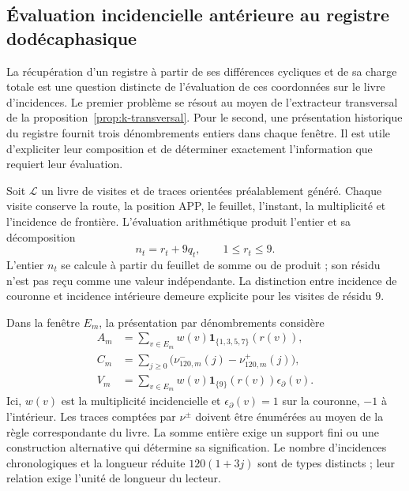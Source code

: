 \subsection{Évaluation incidencielle antérieure au registre dodécaphasique}
\label{subsec:registro-evaluacion-incidencial}

La récupération d'un registre à partir de ses différences cycliques et de sa
charge totale est une question distincte de l'évaluation de ces coordonnées
sur le livre d'incidences. Le premier problème se résout au moyen de
l'extracteur transversal de la proposition~\ref{prop:k-transversal}.
Pour le second, une présentation historique du
registre fournit trois dénombrements entiers dans chaque fenêtre. Il est utile
d'expliciter leur composition et de déterminer exactement l'information que
requiert leur évaluation.

Soit \(\mathscr L\) un livre de visites et de traces orientées préalablement
généré. Chaque visite conserve la route, la position APP, le feuillet,
l'instant, la multiplicité et l'incidence de frontière. L'évaluation
arithmétique produit l'entier et sa décomposition
\[
 n_t=r_t+9q_t,\qquad 1\leq r_t\leq9.
\]
L'entier \(n_t\) se calcule à partir du feuillet de somme ou de produit ; son
résidu n'est pas reçu comme une valeur indépendante. La distinction entre
incidence de couronne et incidence intérieure demeure explicite pour les
visites de résidu \(9\).

Dans la fenêtre \(E_m\), la présentation par dénombrements considère
\begin{align}
 A_m&=\sum_{v\in E_m}w(v)
             \mathbf1_{\{1,3,5,7\}}(r(v)),\\
 C_m&=\sum_{j\geq0}\bigl(\nu^-_{120,m}(j)-\nu^+_{120,m}(j)\bigr),\\
 V_m&=\sum_{v\in E_m}w(v)\mathbf1_{\{9\}}(r(v))\epsilon_\partial(v).
\end{align}
Ici, \(w(v)\) est la multiplicité incidencielle et
\(\epsilon_\partial(v)=1\) sur la couronne, \(-1\) à l'intérieur.
Les traces comptées par \(\nu^\pm\) doivent être énumérées au moyen de la règle
correspondante du livre. La somme entière exige un support fini ou une
construction alternative qui détermine sa signification. Le nombre
d'incidences chronologiques et la longueur réduite \(120(1+3j)\) sont de
types distincts ; leur relation exige l'unité de longueur du lecteur.

